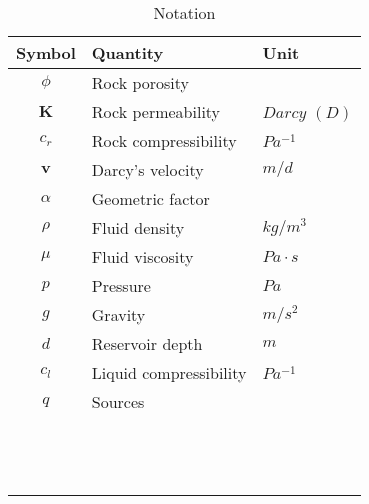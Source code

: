 \documentclass[12pt]{article}
\numberwithin{equation}{section}
\begin{document}
\begin{table}[!h]
\centering
\begin{tabular}{c l l }
\hline
Symbol & Quantity & Unit \\[0.5ex]
\hline
$\phi$ & Rock porosity&   \\
 $\mathbf{K}$& Rock permeability&  $Darcy$ $(D)$ \\
 $c_r$& Rock compressibility&  $Pa^{-1}$ \\
$\mathbf{v}$ & Darcy's velocity& $ m/d$ \\
 $\alpha$& Geometric factor&   \\
$\rho$ &Fluid density &  $kg/m^3$ \\
 $\mu$&Fluid viscosity & $Pa \cdot s$   \\
${p}$  &Pressure &  $Pa$ \\
$g$  &Gravity &  $m/s^2$ \\
$d$ & Reservoir depth&  $m$ \\
$c_l$ &Liquid compressibility &  $Pa^{-1}$ \\
$q$ &Sources &   \\
 & &   \\
 & &   \\
 & &   \\
 & &   \\
 & &   \\
 & &   \\
 & &   \\
 & &   \\
 & &   \\
 & &   \\
 & &   \\
 & &   \\
 & &   \\
\hline
\end{tabular}\label{table:symbols}
\caption{Notation}
\end{table}
\newpage
\end{document}
